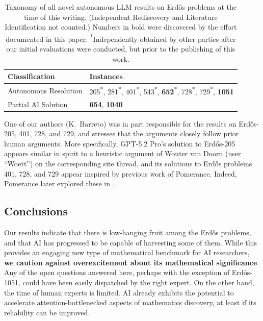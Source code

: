 \documentclass{article}
\theoremstyle{plain}
\theoremstyle{definition}
\begin{document}
\begin{table}[H]
    \centering
    \begin{tabularx}{\textwidth}{@{} >{\raggedright\arraybackslash}p{4cm} X @{}}
    \toprule
    \textbf{Classification} & \textbf{Instances} \\ \midrule
    Autonomous Resolution & 205\textsuperscript{*}, 281\textsuperscript{*}, 401\textsuperscript{*}, 543\textsuperscript{*}, \textbf{652}\textsuperscript{*}, 728\textsuperscript{*}, 729\textsuperscript{*},  \textbf{1051} \\ \addlinespace
    Partial AI Solution & \textbf{654}, \textbf{1040} \\ \bottomrule
    \end{tabularx}
    \caption{Taxonomy of all novel autonomous LLM results on Erd\H{o}s problems at the time of this writing. (Independent Rediscovery and Literature Identification not counted.) Numbers in bold were discovered by the effort documented in this paper. \textsuperscript{*}Independently obtained by other parties after our initial evaluations were conducted, but prior to the publishing of this work.}
    \label{table:LLM_solutions}
\end{table}

One of our authors (K.~Barreto) was in part responsible for the results on Erd\H{o}s-205, 401, 728, and 729, and stresses that the arguments closely follow prior human arguments. More specifically, GPT-5.2 Pro's solution to Erd\H{o}s-205 appears similar in spirit to a heuristic argument of Wouter van Doorn (user ``Woett'') on the corresponding site thread, and its solutions to Erd\H{o}s problems 401, 728, and 729 appear inspired by previous work of Pomerance. Indeed, Pomerance later explored these in \cite{Pomerance26}. 



\subsection{Conclusions} Our results indicate that there is low-hanging fruit among the Erd\H{o}s problems, and that AI has progressed to be capable of harvesting some of them. While this provides an engaging new type of mathematical benchmark for AI researchers, \textbf{we caution against overexcitement about its mathematical significance}. Any of the open questions answered here, perhaps with the exception of Erd\H{o}s-1051, could have been easily dispatched by the right expert. On the other hand, the time of human experts is limited. AI already exhibits the potential to accelerate attention-bottlenecked aspects of mathematics discovery, at least if its reliability can be improved.
\end{document}
